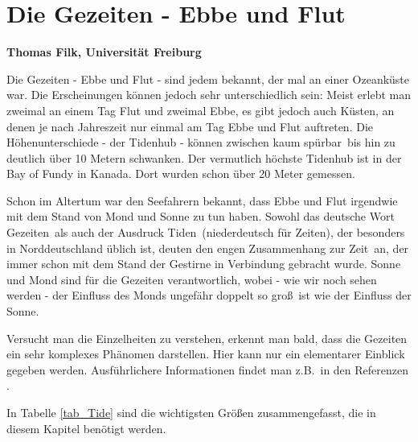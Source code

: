 
\setcounter{page}{1}
\setcounter{section}{0}
\setcounter{figure}{0}
\setcounter{equation}{0}
\setcounter{table}{0}
\setcounter{footnote}{0}

\section*{Die Gezeiten - Ebbe und Flut}
\vspace{0.2cm}
\noindent
{\bf Thomas Filk, Universit\"at Freiburg}
\vspace{1cm}

\label{chap_Gezeiten1}
\noindent
Die Gezeiten - Ebbe und Flut - sind jedem bekannt, der mal an einer Ozeank\"uste
war. Die Erscheinungen k\"onnen jedoch sehr unterschiedlich sein: Meist erlebt man
zweimal an einem Tag Flut und zweimal Ebbe, es gibt jedoch auch K\"usten, an denen
je nach Jahreszeit nur einmal am Tag Ebbe und Flut auftreten. Die H\"ohenunterschiede
- der Tidenhub - 
k\"onnen zwischen \glqq kaum sp\"urbar\grqq\ bis hin zu deutlich \"uber 10 Metern schwanken.  
Der vermutlich h\"ochste Tidenhub ist in der Bay of Fundy in Kanada. 
Dort wurden schon \"uber 20 Meter gemessen. 

Schon im Altertum war den Seefahrern bekannt, dass Ebbe und Flut irgendwie mit
dem Stand von Mond und Sonne zu tun haben. Sowohl das deutsche Wort \glqq Gezeiten\grqq\
als auch der Ausdruck \glqq Tiden\grqq\ (niederdeutsch f\"ur \glqq Zeiten\grqq), 
der besonders in Norddeutschland \"ublich ist,
deuten den engen Zusammenhang zur \glqq Zeit\grqq\ an, der immer schon mit dem Stand
der Gestirne in Verbindung gebracht wurde. Sonne und Mond sind f\"ur die Gezeiten 
verantwortlich, wobei - wie wir noch sehen werden - der Einfluss des Monds ungef\"ahr 
doppelt so gro\ss\ ist wie der Einfluss der Sonne.

Versucht man die Einzelheiten zu verstehen, erkennt man bald, dass die Gezeiten ein
sehr komplexes Ph\"anomen darstellen. Hier kann nur ein elementarer Einblick gegeben werden.
Ausf\"uhrlichere Informationen findet man z.B.\ in den Referenzen \cite{Hicks,Kowalik,Parker}.

In Tabelle \ref{tab_Tide} sind die wichtigsten Gr\"o\ss en zusammengefasst, die in diesem
Kapitel ben\"otigt werden.


